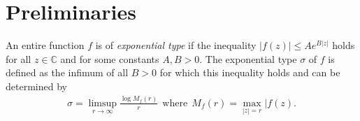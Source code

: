 \documentclass[11pt]{amsart}%
\numberwithin{equation}{section}
\theoremstyle{plain}
\theoremstyle{definition}
\theoremstyle{definition}
\begin{document}









\section{Preliminaries}
An entire function $f$ is of \textit{exponential type} if the inequality $
|f(z)|\leq Ae^{B|z|}$ holds for all $z\in \mathbb{C}$
and for some constants $A,B>0$. The exponential type $\sigma$ of $f$ is defined as the infimum of all $B>0$ for which this inequality holds and can be determined by 
\begin{align*}
\sigma=\limsup\limits_{r\rightarrow\infty}\frac{\log M_f(r)}{r} \ \  \mathrm{where} \ \ M_f(r)=\max_{|z|=r}|f(z).
\end{align*}
\end{document}
